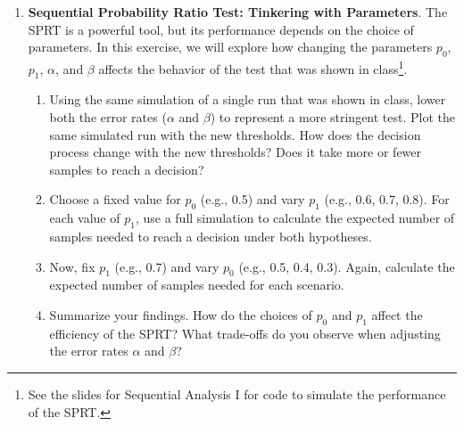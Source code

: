 \documentclass[
  letterpaper,
  DIV=11,
  numbers=noendperiod]{scrartcl}
\begin{document}
\newpage{}

\begin{enumerate}
\def\labelenumi{\arabic{enumi}.}
\setcounter{enumi}{3}
\item
  \textbf{Sequential Probability Ratio Test: Tinkering with Parameters}.
  The SPRT is a powerful tool, but its performance depends on the choice
  of parameters. In this exercise, we will explore how changing the
  parameters \(p_0\), \(p_1\), \(\alpha\), and \(\beta\) affects the
  behavior of the test that was shown in class\footnote{See the slides
    for Sequential Analysis I for code to simulate the performance of
    the SPRT.}.

  \begin{enumerate}
  \def\labelenumii{\alph{enumii}.}
  \item
    Using the same simulation of a single run that was shown in class,
    lower both the error rates (\(\alpha\) and \(\beta\)) to represent a
    more stringent test. Plot the same simulated run with the new
    thresholds. How does the decision process change with the new
    thresholds? Does it take more or fewer samples to reach a decision?
  \item
    Choose a fixed value for \(p_0\) (e.g., 0.5) and vary \(p_1\) (e.g.,
    0.6, 0.7, 0.8). For each value of \(p_1\), use a full simulation to
    calculate the expected number of samples needed to reach a decision
    under both hypotheses.
  \item
    Now, fix \(p_1\) (e.g., 0.7) and vary \(p_0\) (e.g., 0.5, 0.4, 0.3).
    Again, calculate the expected number of samples needed for each
    scenario.
  \item
    Summarize your findings. How do the choices of \(p_0\) and \(p_1\)
    affect the efficiency of the SPRT? What trade-offs do you observe
    when adjusting the error rates \(\alpha\) and \(\beta\)?
  \end{enumerate}
\end{enumerate}

\newpage{}
\end{document}
